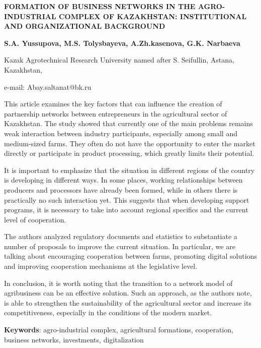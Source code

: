 \begin{articleheader}
{\bfseries FORMATION OF BUSINESS NETWORKS IN THE AGRO-INDUSTRIAL COMPLEX OF KAZAKHSTAN: INSTITUTIONAL AND ORGANIZATIONAL BACKGROUND}

{\bfseries
S.A. Yussupova,
M.S. Tolysbayeva,
A.Zh.kasenova,
G.K. Narbaeva
}
\end{articleheader}

\begin{affiliation}
Kazak Agrotechnical Research University named after S. Seifullin, Astana, Kazakhstan,

e-mail: Abay.saltanat@bk.ru
\end{affiliation}

This article examines the key factors that can influence the creation of
partnership networks between entrepreneurs in the agricultural sector of
Kazakhstan. The study showed that currently one of the main problems
remains weak interaction between industry participants, especially among
small and medium-sized farms. They often do not have the opportunity to
enter the market directly or participate in product processing, which
greatly limits their potential.

It is important to emphasize that the situation in different regions of
the country is developing in different ways. In some places, working
relationships between producers and processors have already been formed,
while in others there is practically no such interaction yet. This
suggests that when developing support programs, it is necessary to take
into account regional specifics and the current level of cooperation.

The authors analyzed regulatory documents and statistics to substantiate
a number of proposals to improve the current situation. In particular,
we are talking about encouraging cooperation between farms, promoting
digital solutions and improving cooperation mechanisms at the
legislative level.

In conclusion, it is worth noting that the transition to a network model
of agribusiness can be an effective solution. Such an approach, as the
authors note, is able to strengthen the sustainability of the
agricultural sector and increase its competitiveness, especially in the
conditions of the modern market.

{\bfseries Keywords}: agro-industrial complex, agricultural formations,
cooperation, business networks, invest\-ments, digitalization

